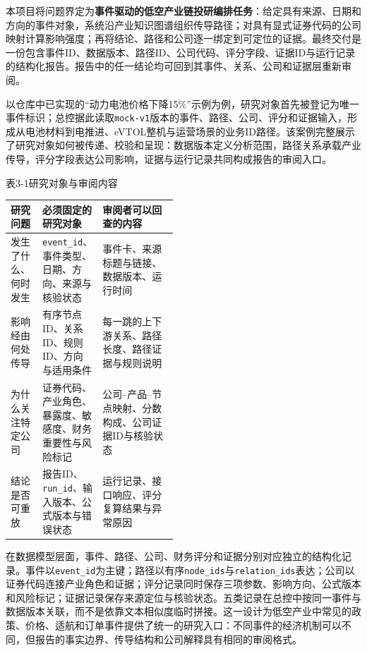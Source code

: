 本项目将问题界定为\textbf{事件驱动的低空产业链投研编排任务}：给定具有来源、日期和方向的事件对象，系统沿产业知识图谱组织传导路径；对具有显式证券代码的公司映射计算影响强度；再将结论、路径和公司逐一绑定到可定位的证据。最终交付是一份包含事件ID、数据版本、路径ID、公司代码、评分字段、证据ID与运行记录的结构化报告。报告中的任一结论均可回到其事件、关系、公司和证据层重新审阅\cite{lhy-architecture,lhy-contracts}。

以仓库中已实现的“动力电池价格下降15\%”示例为例，研究对象首先被登记为唯一事件标识；总控据此读取\texttt{mock-v1}版本的事件、路径、公司、评分和证据输入，形成从电池材料到电推进、eVTOL整机与运营场景的业务ID路径。该案例完整展示了研究对象如何被传递、校验和呈现：数据版本定义分析范围，路径关系承载产业传导，评分字段表达公司影响，证据与运行记录共同构成报告的审阅入口\cite{lhy-repository,lhy-frontend}。

\begin{center}\small 表3-1\quad 研究对象与审阅内容\par\vspace{1mm}
\begin{tabularx}{\linewidth}{p{0.19\linewidth}p{0.28\linewidth}X}
\toprule
研究问题 & 必须固定的研究对象 & 审阅者可以回查的内容\\
\midrule
发生了什么、何时发生 & \texttt{event\_id}、事件类型、日期、方向、来源与核验状态 & 事件卡、来源标题与链接、数据版本、运行时间\\
影响经由何处传导 & 有序节点ID、关系ID、规则ID、方向与适用条件 & 每一跳的上下游关系、路径长度、路径证据与规则说明\\
为什么关注特定公司 & 证券代码、产业角色、暴露度、敏感度、财务重要性与风险标记 & 公司--产品--节点映射、分数构成、公司证据ID与核验状态\\
结论是否可重放 & 报告ID、\texttt{run\_id}、输入版本、公式版本与错误状态 & 运行记录、接口响应、评分复算结果与异常原因\\
\bottomrule
\end{tabularx}\end{center}

在数据模型层面，事件、路径、公司、财务评分和证据分别对应独立的结构化记录。事件以\texttt{event\_id}为主键；路径以有序\texttt{node\_ids}与\texttt{relation\_ids}表达；公司以证券代码连接产业角色和证据；评分记录同时保存三项参数、影响方向、公式版本和风险标记；证据记录保存来源定位与核验状态。五类记录在总控中按同一事件与数据版本关联，而不是依靠文本相似度临时拼接。这一设计为低空产业中常见的政策、价格、适航和订单事件提供了统一的研究入口：不同事件的经济机制可以不同，但报告的事实边界、传导结构和公司解释具有相同的审阅格式。


